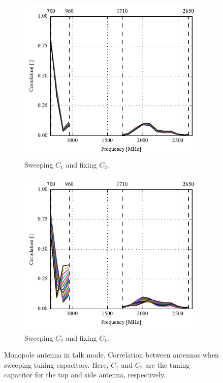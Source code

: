 \begin{figure}[htbp]
    \centering
    \begin{subfigure}{0.49\linewidth}
        \includegraphics{img/tech_sol/monopole/talk_mode/s11_corr}
        \caption{Sweeping $C_1$ and fixing $C_2$.}
    \end{subfigure}
    \hfill
    \begin{subfigure}{0.49\linewidth}
        \includegraphics{img/tech_sol/monopole/talk_mode/s22_corr}
        \caption{Sweeping $C_2$ and fixing $C_1$.}
    \end{subfigure}
    \caption{Monopole antenna in talk mode. Correlation between antennas when sweeping tuning capacitors. Here, $C_1$ and $C_2$ are the tuning capacitor for the top and side antenna, respectively.}
    \label{fig:corr_sol1_read}
\end{figure}

